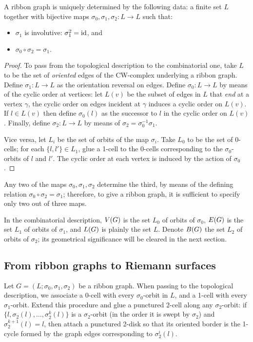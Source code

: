 \begin{lemma}
  A ribbon graph is uniquely determined by the following data: a
  finite set $L$ together with bijective maps $\sigma_0, \sigma_1, \sigma_2: L \to L$ such
  that:
  \begin{itemize}
  \item $\sigma_1$ is involutive: $\sigma_1^2 = \operatorname{id}$, and
  \item $\sigma_0 \circ \sigma_2 = \sigma_1$.
  \end{itemize}
\end{lemma}
\begin{proof}
  To pass from the topological description to the combinatorial one,
  take $L$ to be the set of \emph{oriented} edges of the CW-complex
  underlying a ribbon graph.  Define $\sigma_1:L\to L$ as the orientation
  reversal on edges.  Define $\sigma_0:L\to L$ by means of the cyclic order
  at vertices: let $L(v)$ be the subset of edges in $L$ that
  \emph{end} at a vertex $\gamma$, the cyclic order on edges incident at
  $\gamma$ induces a cyclic order on $L(v)$.  If $l\in L(v)$ then define
  $\sigma_0(l)$ as the successor to $l$ in the cyclic order on $L(v)$.
  Finally, define $\sigma_2: L \to L$ by means of $\sigma_2=\sigma_0^{-1}\sigma_1$.

  Vice versa, let $L_i$ be the set of orbits of the map $\sigma_i$.  Take
  $L_0$ to be the set of 0-cells; for each $\{l,l'\} \in L_1$, glue a
  1-cell to the 0-cells corresponding to the $\sigma_0$-orbits of $l$ and
  $l'$.  The cyclic order at each vertex is induced by the action of
  $\sigma_0$.
\end{proof}
Any two of the maps $\sigma_0, \sigma_1, \sigma_2$ determine the third, by means of
the defining relation $\sigma_0 \circ \sigma_2 = \sigma_1$; therefore, to give a ribbon
graph, it is sufficient to specify only two out of three maps.

In the combinatorial description, $V(G)$ is the set $L_0$ of
orbits of $\sigma_0$, $E(G)$ is the set $L_1$ of orbits of $\sigma_1$, and
$L(G)$ is plainly the set $L$.  Denote $B(G)$ the set $L_2$
of orbits of $\sigma_2$; its geometrical significance will be cleared in
the next section.


\subsection{From ribbon graphs to Riemann surfaces}
\label{sec:rg-to-surfaces}

Let $G = (L; \sigma_0, \sigma_1, \sigma_2)$ be a ribbon graph.  When passing to the
topological description, we associate a 0-cell with every $\sigma_0$-orbit
in $L$, and a 1-cell with every $\sigma_1$-orbit.  Extend this procedure
and glue a punctured 2-cell along any $\sigma_2$-orbit: if $\{l, \sigma_2(l), \ldots,
\sigma_2^k(l)\}$ is a $\sigma_2$-orbit (in the order it is swept by $\sigma_2$) and
$\sigma_2^{k+1}(l) = l$, then attach a punctured 2-disk so that its oriented
border is the 1-cycle formed by the graph edges corresponding to
$\sigma_2^i(l)$.

